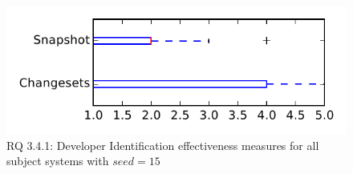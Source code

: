 
\begin{figure}
\centering
\includegraphics[height=0.4\textheight]{figures/dit_seed/rq1_tiny_15}
\caption{RQ 3.4.1: Developer Identification effectiveness measures for all subject systems with $seed=15$}
\label{fig:dit_seed:rq1:tiny}
\end{figure}
